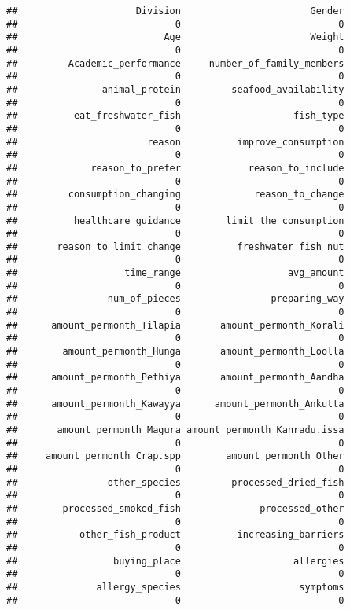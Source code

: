 \documentclass[
]{article}
\begin{document}
\begin{verbatim}
##                     Division                       Gender 
##                            0                            0 
##                          Age                       Weight 
##                            0                            0 
##         Academic_performance     number_of_family_members 
##                            0                            0 
##               animal_protein         seafood_availability 
##                            0                            0 
##          eat_freshwater_fish                    fish_type 
##                            0                            0 
##                       reason          improve_consumption 
##                            0                            0 
##             reason_to_prefer            reason_to_include 
##                            0                            0 
##         consumption_changing             reason_to_change 
##                            0                            0 
##          healthcare_guidance        limit_the_consumption 
##                            0                            0 
##       reason_to_limit_change          freshwater_fish_nut 
##                            0                            0 
##                   time_range                   avg_amount 
##                            0                            0 
##                num_of_pieces                preparing_way 
##                            0                            0 
##      amount_permonth_Tilapia       amount_permonth_Korali 
##                            0                            0 
##        amount_permonth_Hunga       amount_permonth_Loolla 
##                            0                            0 
##      amount_permonth_Pethiya       amount_permonth_Aandha 
##                            0                            0 
##      amount_permonth_Kawayya      amount_permonth_Ankutta 
##                            0                            0 
##       amount_permonth_Magura amount_permonth_Kanradu.issa 
##                            0                            0 
##     amount_permonth_Crap.spp        amount_permonth_Other 
##                            0                            0 
##                other_species         processed_dried_fish 
##                            0                            0 
##        processed_smoked_fish              processed_other 
##                            0                            0 
##           other_fish_product          increasing_barriers 
##                            0                            0 
##                 buying_place                    allergies 
##                            0                            0 
##              allergy_species                     symptoms 
##                            0                            0
\end{verbatim}
\end{document}
